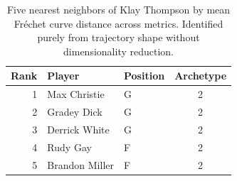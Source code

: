 \begin{table}[htbp]
  \centering\small
  \begin{tabular}{rllc}
    \toprule
    Rank & Player & Position & Archetype \\
    \midrule
    1 & Max Christie & G & 2 \\
    2 & Gradey Dick & G & 2 \\
    3 & Derrick White & G & 2 \\
    4 & Rudy Gay & F & 2 \\
    5 & Brandon Miller & F & 2 \\
    \bottomrule
  \end{tabular}
  \caption{Five nearest neighbors of Klay Thompson by mean Fr\'{e}chet curve distance across metrics. Identified purely from trajectory shape without dimensionality reduction.}
  \label{tab:Klay_Thompson_frechet_curve_neighbors}
\end{table}

